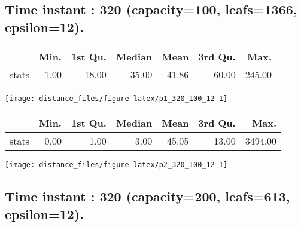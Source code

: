 \documentclass[
  9pt,
  landscape]{article}
\author{}
\date{\vspace{-2.5em}}
\begin{document}
\hypertarget{time-instant-320-capacity100-leafs1366-epsilon12.}{%
\subsection{Time instant : 320 (capacity=100, leafs=1366,
epsilon=12).}\label{time-instant-320-capacity100-leafs1366-epsilon12.}}

\begin{minipage}{0.5\textwidth} 
\centering 
\begin{tabular}{rrrrrrr}
  \hline
 & Min. & 1st Qu. & Median & Mean & 3rd Qu. & Max. \\ 
  \hline
stats & 1.00 & 18.00 & 35.00 & 41.86 & 60.00 & 245.00 \\ 
   \hline
\end{tabular}
\vspace{0.5cm} 


\texttt{[image: distance\_files/figure-latex/p1\_320\_100\_12-1]} 

\end{minipage} 
\begin{minipage}{0.5\textwidth} 
\centering 
\begin{tabular}{rrrrrrr}
  \hline
 & Min. & 1st Qu. & Median & Mean & 3rd Qu. & Max. \\ 
  \hline
stats & 0.00 & 1.00 & 3.00 & 45.05 & 13.00 & 3494.00 \\ 
   \hline
\end{tabular}
\vspace{0.5cm} 


\texttt{[image: distance\_files/figure-latex/p2\_320\_100\_12-1]} 

\end{minipage}

\pagebreak

\hypertarget{time-instant-320-capacity200-leafs613-epsilon12.}{%
\subsection{Time instant : 320 (capacity=200, leafs=613,
epsilon=12).}\label{time-instant-320-capacity200-leafs613-epsilon12.}}
\end{document}
